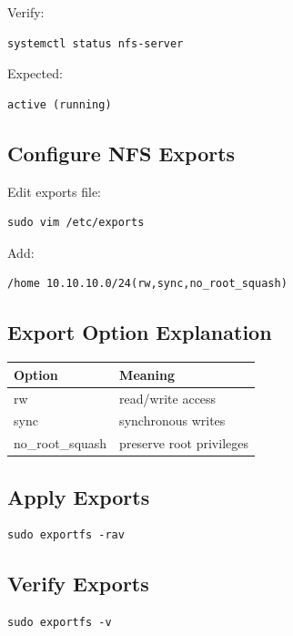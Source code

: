 \documentclass[11pt]{article}
\begin{document}
Verify:

\begin{verbatim}
systemctl status nfs-server
\end{verbatim}

Expected:

\begin{verbatim}
active (running)
\end{verbatim}
\subsection{Configure NFS Exports}
\label{sec:org5c4db99}

Edit exports file:

\begin{verbatim}
sudo vim /etc/exports
\end{verbatim}

Add:

\begin{verbatim}
/home 10.10.10.0/24(rw,sync,no_root_squash)
\end{verbatim}
\subsection{Export Option Explanation}
\label{sec:org511b7f6}

\begin{center}
\begin{tabular}{ll}
Option & Meaning\\
\hline
rw & read/write access\\
sync & synchronous writes\\
no\_root\_squash & preserve root privileges\\
\end{tabular}
\end{center}
\subsection{Apply Exports}
\label{sec:org1ed0cac}

\begin{verbatim}
sudo exportfs -rav
\end{verbatim}
\subsection{Verify Exports}
\label{sec:orgca7148d}

\begin{verbatim}
sudo exportfs -v
\end{verbatim}
\end{document}
